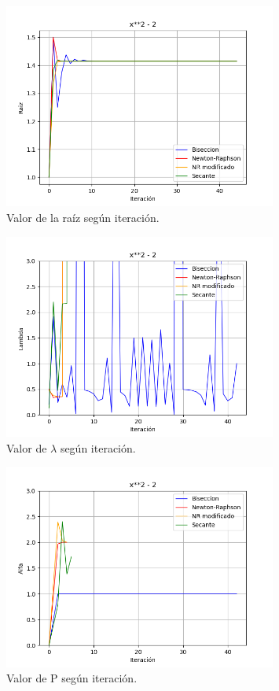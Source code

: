 \documentclass[titlepage,a4paper]{article}
\begin{document}
\begin{figure}[H]
\centering
\includegraphics[width=0.8\textwidth]{raiz f1.png}
\caption{\label{fig:class01}Valor de la raíz según iteración.}
\end{figure}

\begin{figure}[H]
    \centering
    \includegraphics[width=0.8\textwidth]{lambda f1.png}
    \caption{\label{fig:class01}Valor de $\lambda$ según iteración.}
\end{figure}
\begin{figure}[H]
    \centering
    \includegraphics[width=0.8\textwidth]{alfa f1.png}
    \caption{\label{fig:class01}Valor de P según iteración.}
\end{figure}
\end{document}
